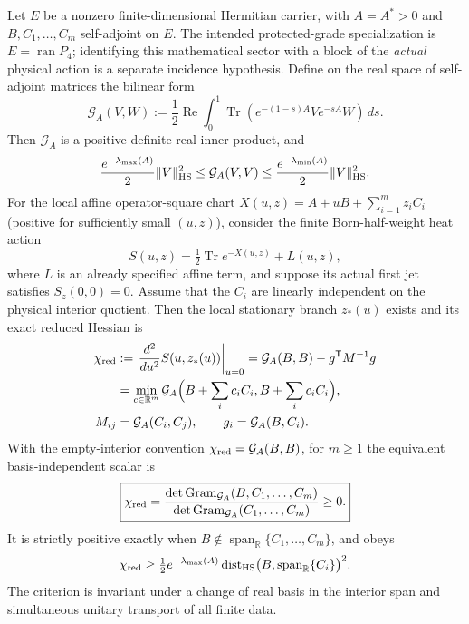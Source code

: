 \documentclass[12pt,a4paper]{article}
\begin{document}
\begin{theorem}
\label{p3b:thm:v286-finite-heat-incidence-gram}
Let $E$ be a nonzero finite-dimensional Hermitian carrier, with
$A=A^*>0$ and $B,C_1,\ldots,C_m$ self-adjoint on $E$.  The intended
protected-grade specialization is $E=\operatorname{ran}P_4$;
identifying this mathematical sector with a block of the \emph{actual}
physical action is a separate incidence hypothesis. Define on the real
space of self-adjoint matrices the bilinear form
\begin{equation}
\label{p3b:eq:v286-heat-gram}
 \mathcal G_A(V,W):=\frac12\operatorname{Re}\int_0^1
 \operatorname{Tr}\!\left(e^{-(1-s)A}V e^{-sA}W\right)\,ds.
\end{equation}
Then $\mathcal G_A$ is a positive definite real inner product, and
\begin{equation}
\label{p3b:eq:v286-gram-comparison}
 \frac{e^{-\lambda_{\max}(A)}}2\|V\|_{\rm HS}^2
 \le\mathcal G_A(V,V)\le
 \frac{e^{-\lambda_{\min}(A)}}2\|V\|_{\rm HS}^2.
\end{equation}
For the local affine operator-square chart
$X(u,z)=A+uB+\sum_{i=1}^m z_iC_i$ (positive for sufficiently small
$(u,z)$), consider the finite Born-half-weight heat action
\[
 S(u,z)=\tfrac12\operatorname{Tr}e^{-X(u,z)}+L(u,z),
\]
where $L$ is an already specified affine term, and suppose its actual
first jet satisfies $S_z(0,0)=0$.  Assume that the $C_i$ are linearly
independent on the physical interior quotient. Then the local stationary
branch $z_*(u)$ exists and its exact reduced Hessian is
\begin{align}
 \chi_{\rm red}&:=\left.\frac{d^2}{du^2}
 S(u,z_*(u))\right|_{u=0}
 =\mathcal G_A(B,B)-g^{\mathsf T}M^{-1}g
 \nonumber\\
 &=\min_{c\in\mathbb R^m}\mathcal G_A
 \Bigl(B+\sum_i c_iC_i,B+\sum_i c_iC_i\Bigr),
 \label{p3b:eq:v286-gram-schur}\\
 M_{ij}&=\mathcal G_A(C_i,C_j),\qquad
 g_i=\mathcal G_A(B,C_i).\nonumber
\end{align}
With the empty-interior convention $\chi_{\rm red}=\mathcal G_A(B,B)$,
for $m\ge1$ the equivalent basis-independent scalar is
\begin{equation}
 \label{p3b:eq:v286-gram-determinant}
 \boxed{\chi_{\rm red}=\frac{\det\operatorname{Gram}_{\mathcal G_A}
 (B,C_1,\ldots,C_m)}{\det\operatorname{Gram}_{\mathcal G_A}
 (C_1,\ldots,C_m)}\ge0.}
\end{equation}
It is strictly positive exactly when
$B\notin\operatorname{span}_{\mathbb R}\{C_1,\ldots,C_m\}$, and obeys
\[
 \chi_{\rm red}\ge\tfrac12e^{-\lambda_{\max}(A)}
 \operatorname{dist}_{\rm HS}
 \bigl(B,\operatorname{span}_{\mathbb R}\{C_i\}\bigr)^2.
\]
The criterion is invariant under a change of real basis in the
interior span and simultaneous unitary transport of all finite data.
\end{theorem}
\end{document}
